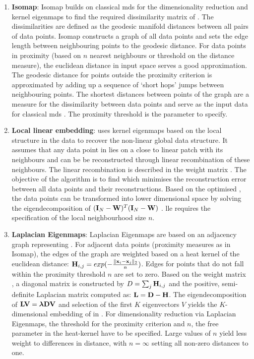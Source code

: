 \begin{enumerate}
\item\textbf{Isomap}: Isomap builds on classical \gls{mds} for the dimensionality reduction and kernel eigenmaps to find the required dissimilarity matrix of . The dissimilarities are defined as the geodesic manifold distances between all pairs of data points. Isomap constructs a graph of all data points and sets the edge length between neighbouring points to the geodesic distance. For data points in proximity (based on \(n\) nearest neighbours or threshold on the distance measure), the euclidean distance in input space serves a good approximation. The geodesic distance for points outside the proximity criterion is approximated by adding up a sequence of `short hops' jumps  between neighbouring points. The shortest distances between points of the graph are a measure for the dissimilarity between data points and serve as the input data for classical \gls{mds} \citep{Tenenbaum2000}. The proximity threshold is the parameter to specify. 

\item\textbf{Local linear embedding}:  uses kernel eigenmaps based on the local structure in the data to recover the non-linear global data structure. It assumes that any data point in  lies on a close to linear patch with its neighbours and can be be reconstructed through linear recombination of these neighbours. The linear recombination is described in the weight matrix . The objective of the algorithm is to find  which minimises the reconstruction error between all data points and their reconstructions. Based on the optimised , the data points  can be transformed into lower dimensional space  by solving the eigendecomposition of \((\boldsymbol{\mathbf{I}}_{N} -\boldsymbol{\mathbf{W}})^T(\boldsymbol{\mathbf{I}}_{N} -\boldsymbol{\mathbf{W}})\) \citep{Roweis2000}. \gls{lle} requires the specification of the local neighbourhood size \(n\). 

\item\textbf{Laplacian Eigenmaps}: Laplacian Eigenmaps are based on an adjacency graph representing . For adjacent data points (proximity measures as in Isomap), the edges of the graph are weighted based on a heat kernel of the euclidean distance: \(\boldsymbol{\mathbf{H}}_{i,j}=exp(-\frac{\lVert \boldsymbol{\mathbf{x}}_{i} - \boldsymbol{\mathbf{x}}_{j}\rVert_2}{n})\). Edges for points that do not fall within the proximity threshold \(n\) are set to zero.  Based on the weight matrix , a diagonal matrix  is constructed by \(D = \sum_{j} \boldsymbol{\mathbf{H}}_{i,j}\) and the positive, semi-definite Laplacian matrix  computed as: \(\boldsymbol{\mathbf{L}} = \boldsymbol{\mathbf{D}} - \boldsymbol{\mathbf{H}}\). The eigendecomposition of \(\boldsymbol{\mathbf{LV}} = \boldsymbol{\mathbf{\lambda DV}}\) and selection of the first \(K\) eigenvectors \(V\) yields the \(K\)-dimensional embedding of  in  \citep{Belkin2003}. For dimensionality reduction via Laplacian Eigenmaps, the threshold for the proximity criterion and \(n\), the free parameter in the heat-kernel have to be specified. Large values of \(n\) yield less weight to differences in distance, with \(n=\infty\) setting all non-zero distances to one. 
 

\end{enumerate}
